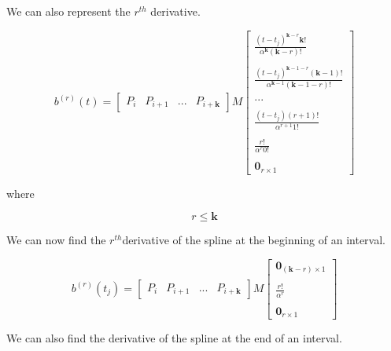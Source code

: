 \documentclass{article}
\begin{document}
We can also represent the \(r^{th}\) derivative.

\begin{equation}
    b^{(r)}(t) = \begin{bmatrix} P_{i} & P_{i+1} & ... & P_{i+\textbf{k}}\end{bmatrix} M \begin{bmatrix}
    \frac{(t-t_j)^{\textbf{k}-r} \textbf{k}!}{ \alpha^{\textbf{k}} (\textbf{k}-r)!} \\ \\ \frac{(t-t_j)^{\textbf{k}-1-r} (\textbf{k}-1)!}{ \alpha^{\textbf{k}-1} (\textbf{k}-1-r)!} \\ \\ 
    ... 
    \\ \\ 
    \frac{(t-t_j)(r+1)!}{\alpha^{r+1} 1! } 
    \\ \\ \frac{r!}{\alpha^r 0!} 
    \\ \\ \textbf{0}_{r \times 1} \end{bmatrix}
\end{equation}

where

\begin{equation}
    r \leq \textbf{k}
\end{equation}

We can now find the \(r^{th}\)derivative of the spline at the beginning of an interval.

\begin{equation}
    b^{(r)}(t_{j}) = \begin{bmatrix} P_{i} & P_{i+1} & ... & P_{i+\textbf{k}}\end{bmatrix} M \begin{bmatrix} \textbf{0}_{(\textbf{k}-r) \times 1} \\ \\ \frac{r!}{\alpha^r} \\ \\ \textbf{0}_{r \times 1} \end{bmatrix}
\end{equation}

We can also find the derivative of the spline at the end of an interval.
\end{document}

